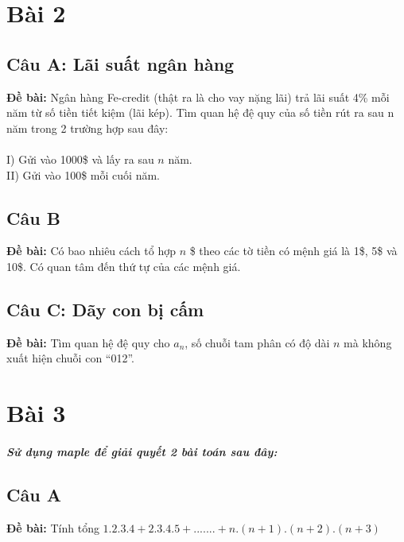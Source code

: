 \documentclass[12pt]{article}
\begin{document}
\begin{sloppypar}
\section{Bài 2}

\subsection{Câu A: Lãi suất ngân hàng}
\begin{tcolorbox}
    \textbf{Đề bài:} Ngân hàng Fe-credit (thật ra là cho vay nặng lãi) trả lãi suất 4\% mỗi năm từ số tiền tiết kiệm (lãi kép). Tìm quan hệ đệ quy của số tiền rút ra sau n năm trong 2 trường hợp sau đây: \\ \\
    I)  Gửi vào 1000\$ và lấy ra sau \(n\) năm. \\
    II) Gửi vào 100\$ mỗi cuối năm.
\end{tcolorbox}

\subsection{Câu B}
\begin{tcolorbox}
    \textbf{Đề bài:} Có bao nhiêu cách tổ hợp \(n\) \$ theo các tờ tiền có mệnh giá là 1\$, 5\$ và 10\$. Có quan tâm đến thứ tự của các mệnh giá.
\end{tcolorbox}

\subsection{Câu C: Dãy con bị cấm}
\begin{tcolorbox}
    \textbf{Đề bài:} Tìm quan hệ đệ quy cho \(a_{n}\), số chuỗi tam phân có độ dài \(n\) mà không xuất hiện chuỗi con “012”.
\end{tcolorbox}

\section{Bài 3}
\subparagraph {Sử dụng maple để giải quyết 2 bài toán sau đây:}

\subsection{Câu A}
\begin{tcolorbox}
    \textbf{Đề bài:} Tính tổng \(1.2.3.4 + 2.3.4.5 + ....... + n.(n+1).(n+2).(n+3)\)
\end{tcolorbox}


\end{sloppypar}
\end{document}
